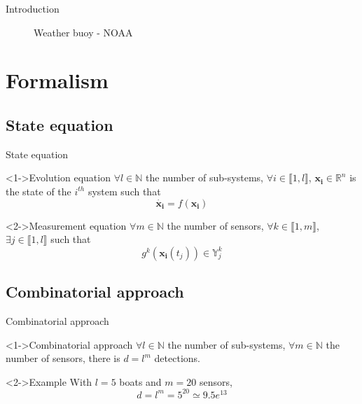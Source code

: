 \documentclass{beamer}
\begin{document}
\begin{frame}{Introduction}
\begin{minipage}[b]{0.4\textwidth}
\begin{figure}
                        \caption{Weather buoy - NOAA\footnotemark[1]}
                    \end{figure}
                \end{minipage}

            \end{frame}

    \section{Formalism}

        \subsection{State equation}

            \begin{frame}{State equation}
                \begin{block}<1->{Evolution equation}
                    $\forall l \in \mathbb{N}$ the number of sub-systems, $\forall i \in \llbracket 1, l\rrbracket$, $\mathbf{x_i} \in \mathbb{R}^n$ is the state of the $i^{th}$ system such that
                    \begin{equation}
                        \dot{\mathbf{x_i}} = f(\mathbf{x_i})
                    \end{equation}
                \end{block}

                \begin{block}<2->{Measurement equation}
                    $\forall m \in \mathbb{N}$ the number of sensors, $\forall k \in \llbracket 1, m\rrbracket$, $\exists j \in \llbracket 1, l\rrbracket$ such that
                    \begin{equation}
                        g^k(\mathbf{x_i}(t_j)) \in \mathbb{Y}_j^k
                    \end{equation}
                \end{block}
            \end{frame}

        \subsection{Combinatorial approach}

            \begin{frame}{Combinatorial approach}
                \begin{block}<1->{Combinatorial approach}
                    $\forall l \in \mathbb{N}$ the number of sub-systems, $\forall m \in \mathbb{N}$ the number of sensors, there is $d = l^m$ detections.
                \end{block}
                \begin{exampleblock}<2->{Example}
                    With $l = 5$ boats and $m = 20$ sensors,
                    $$d = l^m = 5^{20} \simeq 9.5e^{13}$$
                \end{exampleblock}
            \end{frame}
\end{document}
